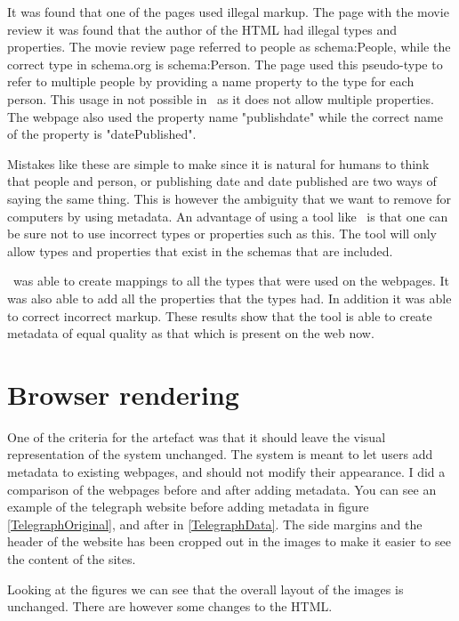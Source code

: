 It was found that one of the pages used illegal markup.
The page with the movie review it was found that the author of the HTML had illegal types and properties.
The movie review page referred to people as schema:People, while the correct type in schema.org is schema:Person.
The page used this pseudo-type to refer to multiple people by providing a name property to the type for each person.
This usage in not possible in \theartefact\ as it does not allow multiple properties.
The webpage also used the property name "publishdate" while the correct name of the property is "datePublished".

Mistakes like these are simple to make since it is natural for humans to think that people and person,
or publishing date and date published are two ways of saying the same thing.
This is however the ambiguity that we want to remove for computers by using metadata.
An advantage of using a tool like \theartefact\ is that one can be sure not to use incorrect types or properties such as this.
The tool will only allow types and properties that exist in the schemas that are included.

\Theartefact\ was able to create mappings to all the types that were used on the webpages.
It was also able to add all the properties that the types had.
In addition it was able to correct incorrect markup.
These results show that the tool is able to create metadata of equal quality as that which is present on the web now.

\section{Browser rendering}
\label{Rendering}
One of the criteria for the artefact was that it should leave the visual representation of the system unchanged.
The system is meant to let users add metadata to existing webpages, and should not modify their appearance.
I did a comparison of the webpages before and after adding metadata.
You can see an example of the telegraph website before adding metadata in figure \ref{TelegraphOriginal},
and after in \ref{TelegraphData}.
The side margins and the header of the website has been cropped out in the images to make it easier to see the content of the sites.


Looking at the figures we can see that the overall layout of the images is unchanged.
There are however some changes to the HTML.

